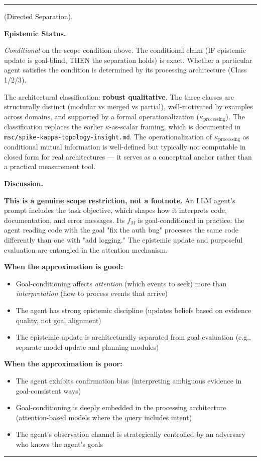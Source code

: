\documentclass[11pt,oneside]{article}
\newcounter{claim}[section]
\renewcommand{\theclaim}{\thesection.\arabic{claim}}
\newenvironment{segment}[2]{%
  \refstepcounter{claim}%
  \bigskip\noindent\hrule\smallskip
  \noindent{\bfseries #1~\theclaim}\enskip(#2).\par\smallskip
  \noindent\ignorespaces
}{%
  \par\smallskip\noindent\hrule\bigskip
}
\newenvironment{proposition}[1][]{\begin{segment}{Proposition}{#1}}{\end{segment}}
\begin{document}
\begin{proposition}[Directed Separation]
\medskip\noindent\textbf{Epistemic Status.}


\textit{Conditional} on the scope condition above. The conditional claim (IF epistemic update is goal-blind, THEN the separation holds) is exact. Whether a particular agent satisfies the condition is determined by its processing architecture (Class 1/2/3).

The architectural classification: \textbf{robust qualitative}. The three classes are structurally distinct (modular vs merged vs partial), well-motivated by examples across domains, and supported by a formal operationalization ($\kappa_{\text{processing}}$). The classification replaces the earlier $\kappa$-as-scalar framing, which is documented in \texttt{msc/spike-kappa-topology-insight.md}. The operationalization of $\kappa_{\text{processing}}$ as conditional mutual information is well-defined but typically not computable in closed form for real architectures — it serves as a conceptual anchor rather than a practical measurement tool.


\medskip\noindent\textbf{Discussion.}


\textbf{This is a genuine scope restriction, not a footnote.} An LLM agent's prompt includes the task objective, which shapes how it interprets code, documentation, and error messages. Its $f_M$ is goal-conditioned in practice: the agent reading code with the goal "fix the auth bug" processes the same code differently than one with "add logging." The epistemic update and purposeful evaluation are entangled in the attention mechanism.

\textbf{When the approximation is good:}
\begin{itemize}
  \item Goal-conditioning affects \textit{attention} (which events to seek) more than \textit{interpretation} (how to process events that arrive)
  \item The agent has strong epistemic discipline (updates beliefs based on evidence quality, not goal alignment)
  \item The epistemic update is architecturally separated from goal evaluation (e.g., separate model-update and planning modules)
\end{itemize}


\textbf{When the approximation is poor:}
\begin{itemize}
  \item The agent exhibits confirmation bias (interpreting ambiguous evidence in goal-consistent ways)
  \item Goal-conditioning is deeply embedded in the processing architecture (attention-based models where the query includes intent)
  \item The agent's observation channel is strategically controlled by an adversary who knows the agent's goals
\end{itemize}



\end{proposition}
\end{document}
